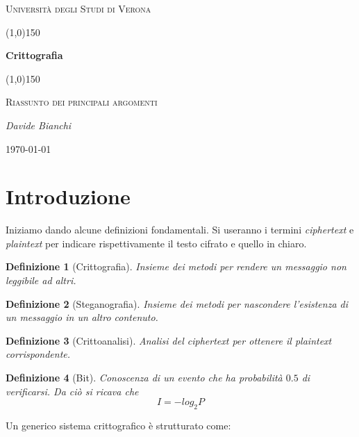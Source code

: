 \documentclass[a4paper, 11pt]{article}
\newtheorem{definit}{Definizione}[subsection]
\begin{document}
	\clearpage
	\begin{titlepage}
		\centering
		\vspace*{\fill}
		{\scshape\LARGE Università degli Studi di Verona \par}
		\vspace{1.5cm}
		\line(1,0){150} \\
		{\huge\bfseries Crittografia\par}
		\line(1,0){150} \\
		\vspace{0.5cm}
		{\scshape\Large Riassunto dei principali argomenti\par}
		\vspace{2cm}
		{\Large\itshape Davide Bianchi\par}
		\vspace{1cm}
		\vspace{5cm}
		\vspace*{\fill}
		{\large \today\par}
	\end{titlepage}
	\thispagestyle{empty}
	\newpage
	\tableofcontents
	\newpage
	
	\section{Introduzione}
	Iniziamo dando alcune definizioni fondamentali. Si useranno i termini \textit{ciphertext} e \textit{plaintext} per indicare rispettivamente il testo cifrato e quello in chiaro.
	
	\begin{definit}[Crittografia]
		Insieme dei metodi per rendere un messaggio non leggibile ad altri.
	\end{definit}
	
	\begin{definit}[Steganografia]
		Insieme dei metodi per nascondere l'esistenza di un messaggio in un altro contenuto.
	\end{definit}
	
	\begin{definit}[Crittoanalisi]
		Analisi del ciphertext per ottenere il plaintext corrispondente.
	\end{definit}
	
	\begin{definit}[Bit]
		Conoscenza di un evento che ha probabilità $0.5$ di verificarsi. Da ciò si ricava che \[ I = -log_2P \]
	\end{definit}
	
	Un generico sistema crittografico è strutturato come: \\
	
\end{document}
